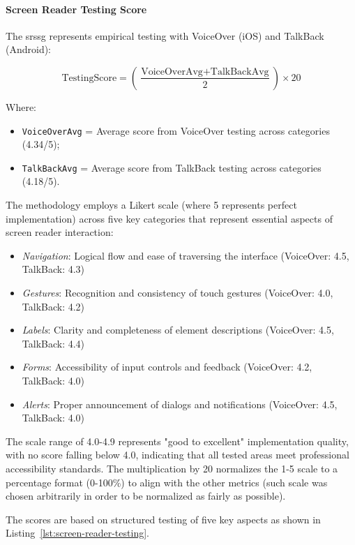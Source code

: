 \FloatBarrier

\paragraph{Screen Reader Testing Score}

The \gls{srssg} represents empirical testing with VoiceOver (iOS) and TalkBack (Android):

\begin{equation}
\text{TestingScore} 
= \left(\frac{\text{VoiceOverAvg} + \text{TalkBackAvg}}{2}\right) \times 20
\end{equation}

Where:
\begin{itemize}
    \item \texttt{VoiceOverAvg} = Average score from VoiceOver testing across categories (4.34/5);
    \item \texttt{TalkBackAvg} = Average score from TalkBack testing across categories (4.18/5).
\end{itemize}

The methodology employs a Likert scale (where 5 represents perfect implementation) across five key categories that represent essential aspects of screen reader interaction:
\begin{itemize}
\item \textit{Navigation}: Logical flow and ease of traversing the interface (VoiceOver: 4.5, TalkBack: 4.3)
\item \textit{Gestures}: Recognition and consistency of touch gestures (VoiceOver: 4.0, TalkBack: 4.2)
\item \textit{Labels}: Clarity and completeness of element descriptions (VoiceOver: 4.5, TalkBack: 4.4)
\item \textit{Forms}: Accessibility of input controls and feedback (VoiceOver: 4.2, TalkBack: 4.0)
\item \textit{Alerts}: Proper announcement of dialogs and notifications (VoiceOver: 4.5, TalkBack: 4.0)
\end{itemize}

The scale range of 4.0-4.9 represents "good to excellent" implementation quality, with no score falling below 4.0, indicating that all tested areas meet professional accessibility standards. The multiplication by 20 normalizes the 1-5 scale to a percentage format (0-100\%) to align with the other metrics (such scale was chosen arbitrarily in order to be normalized as fairly as possible). 

The scores are based on structured testing of five key aspects as shown in Listing~\ref{lst:screen-reader-testing}.

